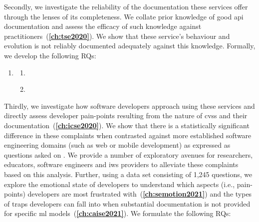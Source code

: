 Secondly, we investigate the reliability of the documentation these services offer through the lenses of its completeness. We collate prior knowledge of good \gls{api} documentation and assess the efficacy of such knowledge against practitioners~(\textbf{\cref{ch:tse2020}}). We show that these service's behaviour and evolution is not reliably documented adequately against this knowledge. Formally, we develop the following RQs:

\begin{leftbar}
\begin{enumerate}[label=\faQuestionCircle~~\textbf{RQ\arabic*.}, ref=RQ\arabic*, leftmargin=2.5\parindent, rightmargin=1\parindent,start=2]
    \item \textbf{\RQTwoTextDocumentation{}}\label{rq:docs}
    \begin{enumerate}[label=\textit{RQ2.\arabic*.}, ref=RQ2.\arabic*]
      \item \RQTwoTextDocumentationWhatIsCompleteDocs{} \label{rq:docs:complete}
      \item \RQTwoTextDocumentationMissingAttributes{} \label{rq:docs:missing}
    \end{enumerate}
\end{enumerate}
\end{leftbar}

Thirdly, we investigate how software developers approach using these services and directly assess developer pain-points resulting from the nature of \glspl{cvs} and their documentation~(\textbf{\cref{ch:icse2020}}). We show that there is a statistically significant difference in these complaints when contrasted against more established software engineering domains (such as web or mobile development) as expressed as questions asked on . We provide a number of exploratory avenues for researchers, educators, software engineers and \gls{iws} providers to alleviate these complaints based on this analysis. Further, using a data set consisting of 1,245  questions, we explore the emotional state of developers to understand which aspects (i.e., pain-points) developers are most frustrated with~(\textbf{\cref{ch:semotion2021}}) and the types of traps developers can fall into when substantial documentation is not provided for specific \gls{ml} models~(\textbf{\cref{ch:caise2021}}). We formulate the following RQs:

